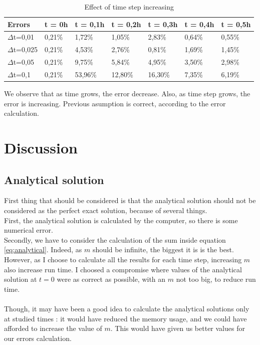 \documentclass{article}
\begin{document}
        \begin{table}[H]
            \centering
            \caption{Effect of time step increasing }
            \begin{tabular}{|l|l|l|l|l|l|l|}
                \hline
                Errors   & t = 0h & t = 0,1h & t = 0,2h  & t = 0,3h  & t = 0,4h & t = 0,5h \\ \hline
                $\Delta$t=0,01  & 0,21\% & 1,72\%   & 1,05\%  & 2,83\%  & 0,64\% & 0,55\% \\ \hline
                $\Delta$t=0,025 & 0,21\% & 4,53\%   & 2,76\%  & 0,81\%  & 1,69\% & 1,45\% \\ \hline
                $\Delta$t=0,05  & 0,21\% & 9,75\%   & 5,84\%  & 4,95\%  & 3,50\% & 2,98\% \\ \hline
                $\Delta$t=0,1   & 0,21\% & 53,96\%  & 12,80\% & 16,30\% & 7,35\% & 6,19\% \\ \hline
            \end{tabular}
        \end{table}

        We observe that as time grows, the error decrease. Also, as time step grows, the error is increasing.
        Previous asumption is correct, according to the error calculation.
    \newpage
    \section{Discussion}
        \subsection{Analytical solution}
            First thing that should be considered is that the analytical solution should not be
            considered as the perfect exact solution, because of several things.
            \\
            First, the analytical solution is calculated by the computer, so there is some numerical error.
            \\
            Secondly, we have to consider the calculation of the sum inside equation \eqref{eq:analytical}.
            Indeed, as $m$ should be infinite, the biggest it is is the best. However, as I choose to calculate
            all the results for each time step, increasing $m$ also increase run time. I choosed a compromise
            where values of the analytical solution at $t=0$ were as correct as possible, with an $m$ not too big,
            to reduce run time.
            \\
            \\
            Though, it may have been a good idea to calculate the analytical solutions only at studied times : 
            it would have reduced the memory usage, and we could have afforded to increase the value of $m$.
            This would have given us better values for our errors calculation.
\end{document}
